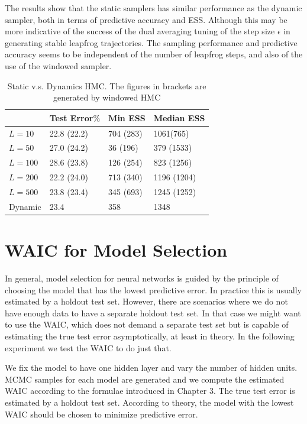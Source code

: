 \documentclass[12pt]{report}
\begin{document}
The results show that the static samplers has similar performance as the dynamic sampler, both in terms of predictive accuracy and ESS. Although this may be more indicative of the success of the dual averaging tuning of the step size $\epsilon$ in generating stable leapfrog trajectories. The sampling performance and predictive accuracy seems to be independent of the number of leapfrog steps, and also of the use of the windowed sampler. 
\begin{table}[]
\centering
\begin{tabular}{@{}llll@{}}
\toprule
        & Test Error$\%$ & Min ESS & Median ESS \\ \midrule
$L = 10 $  & 22.8 (22.2)    & 704 (283) & 1061(765)       \\ \midrule
$L = 50 $  & 27.0 (24.2)  & 36 (196)  & 379 (1533)     \\ \midrule
$L = 100  $  & 28.6 (23.8)  & 126 (254)  & 823 (1256)    \\ \midrule
$L = 200  $   & 22.2 (24.0)    & 713 (340)      & 1196 (1204)         \\ \midrule
$L = 500   $ & 23.8  (23.4)       & 345 (693)      & 1245  (1252)        \\ \midrule
Dynamic & 23.4         & 358       & 1348         \\ \bottomrule 
\end{tabular}
\caption{Static v.s. Dynamics HMC. The figures in brackets are generated by windowed HMC}
\label{my-label}
\end{table}

\section{WAIC for Model Selection}

In general, model selection for neural networks is guided by the principle of choosing the model that has the lowest predictive error. In practice this is usually estimated by a holdout test set. However, there are scenarios where we do not have enough data to have a separate holdout test set. In that case we might want to use the WAIC, which does not demand a separate test set but is capable of estimating the true test error asymptotically, at least in theory. In the following experiment we test the WAIC to do just that.

We fix the model to have one hidden layer and vary the number of hidden units. MCMC samples for each model are generated and we compute the estimated WAIC according to the formulae introduced in Chapter 3. The true test error is estimated by a holdout test set.  According to theory, the model with the lowest WAIC should be chosen to minimize predictive error. 
\end{document}
